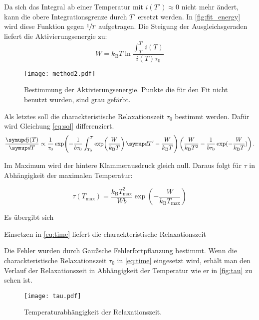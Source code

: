  Da sich das Integral ab einer Temperatur mit $i(T') \approx 0$ nicht mehr ändert,
kann die obere Integrationsgrenze durch $T'$ ersetzt werden.
In \autoref{fig:fit_energy} wird diese Funktion gegen $\sfrac{1}{T}$ aufgetragen.
Die Steigung der Ausgleichsgeraden liefert die Aktivierungsenergie zu:
\begin{equation}
  
\end{equation}
\begin{equation}
  W = k_\text{B} T \ln \frac{\int_T^{T'} i(T)}{ i(T) \tau_0}
  \label{eq:final}
\end{equation}


\begin{figure}
  \centering
  \texttt{[image: method2.pdf]}
  \caption{Bestimmung der Aktivierungsenergie. Punkte die für den Fit nicht benutzt wurden, sind grau gefärbt.}
  \label{fig:fit_energy}
\end{figure}


Als letztes soll die charackteristische Relaxationszeit $\tau_0$ bestimmt werden. Dafür wird Gleichung \eqref{eq:sol} differenziert.
\begin{equation}
  \label{eq:crazy}
  \dd{j(T)}{T} \propto
    \frac{1}{\tau_0}
    \exp\!\left(
      -\frac{1}{b\tau_0} \int_{T_0}^{T} \exp\! \left( \frac{W}{k_\text{B} T} \right)  \dif{T'} - \frac{W}{k_\text{B} T}
    \right) \left( \frac{W}{k_\text{B} T^2} -   \frac{1}{b\tau_0}\exp(-\frac{W}{k_\text{B} T}) \right).
\end{equation}

Im Maximum wird der hintere Klammerausdruck gleich null. Daraus folgt für $\tau$ in Abhängigkeit der maximalen Temperatur:

\begin{equation}
  \label{eq:tau}
  \tau(T_\text{max}) = \frac{k_\text{B} T_\text{max}^2}{W b} \exp\left(-\frac{W}{k_\text{B} T_\text{max}} \right)
\end{equation}

Es übergibt sich
\begin{equation}
  
\end{equation}

Einsetzen in \eqref{eq:time} liefert die  charackteristische Relaxationszeit
\begin{equation}
  
\end{equation}

Die Fehler wurden durch Gaußsche Fehlerfortpflanzung bestimmt.
Wenn die charackteristische Relaxationszeit $\tau_0$ in \eqref{eq:time} eingesetzt wird,
erhält man den Verlauf der  Relaxationszeit in Abhängigkeit der Temperatur wie er in \autoref{fig:tau} zu sehen ist.
\begin{figure}
  \centering
  \texttt{[image: tau.pdf]}
  \caption{Temperaturabhängigkeit der Relaxationszeit.}
  \label{fig:tau}
\end{figure}
